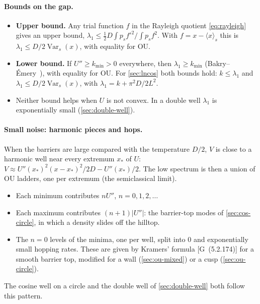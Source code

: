 \documentclass[11pt]{article}
\numberwithin{equation}{section}
\newcommand{\avg}[1]{\langle #1\rangle}
\newcommand{\G}[1]{[G~(#1)]}
\begin{document}
\paragraph{Bounds on the gap.}
\begin{itemize}
  \item \textbf{Upper bound.} Any trial function $f$ in the Rayleigh quotient \cref{eq:rayleigh} gives an upper bound,
        $\lambda_1\le\frac12D\int p_sf'^2\big/\int p_sf^2$. With $f=x-\avg x_s$ this is
        $\lambda_1\le D/2\operatorname{Var}_s(x)$, with equality for OU.
  \item \textbf{Lower bound.} If $U''\ge k_{\min}>0$ everywhere, then $\lambda_1\ge k_{\min}$ (Bakry--\'Emery~\cite{bakry}),
        with equality for OU. For \cref{sec:lncos} both bounds hold: $k\le\lambda_1$ and
        $\lambda_1\le D/2\operatorname{Var}_s(x)$, with $\lambda_1=k+\pi^2D/2L^2$.
  \item Neither bound helps when $U$ is not convex. In a double well $\lambda_1$ is exponentially small
        (\cref{sec:double-well}).
\end{itemize}

\paragraph{Small noise: harmonic pieces and hops.} When the barriers are large compared with the temperature
$D/2$, $V$ is close to a harmonic well near every extremum $x_*$ of $U$:
$V\approx U''(x_*)^2(x-x_*)^2/2D-U''(x_*)/2$. The low spectrum is then a union of OU ladders, one per
extremum (the semiclassical limit).
\begin{itemize}
  \item Each minimum contributes $nU''$, $n=0,1,2,\dots$
  \item Each maximum contributes $(n+1)|U''|$: the barrier-top modes of \cref{sec:cos-circle}, in which a density
        slides off the hilltop.
  \item The $n=0$ levels of the minima, one per well, split into $0$ and exponentially small hopping rates. These
        are given by Kramers' formula \G{5.2.174} for a smooth barrier top, modified for a wall
        (\cref{sec:ou-mixed}) or a cusp (\cref{sec:ou-circle}).
\end{itemize}
The cosine well on a circle and the double well of \cref{sec:double-well} both follow this pattern.
\end{document}
